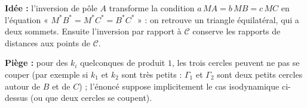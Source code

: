 \textbf{Idée :} l'inversion de pôle $A$ transforme la condition $a\,MA=b\,MB=c\,MC$ en l'équation « $M^*B^*=M^*C^*=B^*C^*$ » : on retrouve un triangle équilatéral, qui a deux sommets. Ensuite l'inversion par rapport à $\mathcal C$ conserve les rapports de distances aux points de $\mathcal C$.

\textbf{Piège :} pour des $k_i$ quelconques de produit $1$, les trois cercles peuvent ne pas se couper (par exemple si $k_1$ et $k_2$ sont très petits : $\Gamma_1$ et $\Gamma_2$ sont deux petits cercles autour de $B$ et de $C$) ; l'énoncé suppose implicitement le cas isodynamique ci-dessus (ou que deux cercles se coupent).
